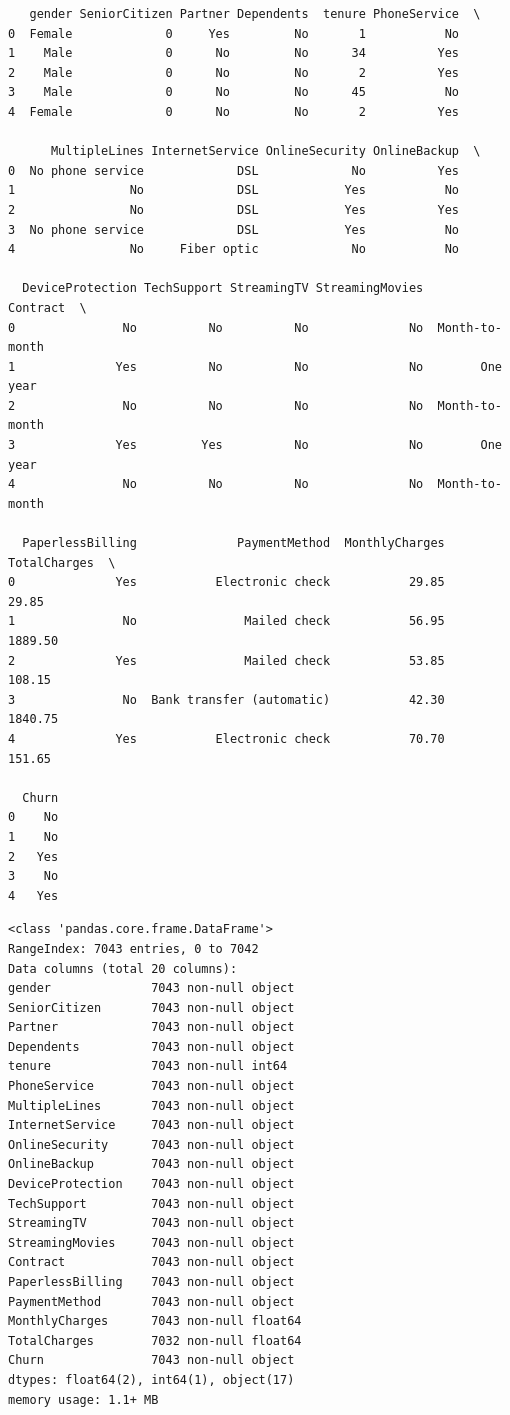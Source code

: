\documentclass[8pt,onecolumn,aps,pra]{revtex4-1}
\begin{document}
    
    \begin{verbatim}
   gender SeniorCitizen Partner Dependents  tenure PhoneService  \
0  Female             0     Yes         No       1           No   
1    Male             0      No         No      34          Yes   
2    Male             0      No         No       2          Yes   
3    Male             0      No         No      45           No   
4  Female             0      No         No       2          Yes   

      MultipleLines InternetService OnlineSecurity OnlineBackup  \
0  No phone service             DSL             No          Yes   
1                No             DSL            Yes           No   
2                No             DSL            Yes          Yes   
3  No phone service             DSL            Yes           No   
4                No     Fiber optic             No           No   

  DeviceProtection TechSupport StreamingTV StreamingMovies        Contract  \
0               No          No          No              No  Month-to-month   
1              Yes          No          No              No        One year   
2               No          No          No              No  Month-to-month   
3              Yes         Yes          No              No        One year   
4               No          No          No              No  Month-to-month   

  PaperlessBilling              PaymentMethod  MonthlyCharges  TotalCharges  \
0              Yes           Electronic check           29.85         29.85   
1               No               Mailed check           56.95       1889.50   
2              Yes               Mailed check           53.85        108.15   
3               No  Bank transfer (automatic)           42.30       1840.75   
4              Yes           Electronic check           70.70        151.65   

  Churn  
0    No  
1    No  
2   Yes  
3    No  
4   Yes  
    \end{verbatim}

    
    \begin{Verbatim}[commandchars=\\\{\}]
<class 'pandas.core.frame.DataFrame'>
RangeIndex: 7043 entries, 0 to 7042
Data columns (total 20 columns):
gender              7043 non-null object
SeniorCitizen       7043 non-null object
Partner             7043 non-null object
Dependents          7043 non-null object
tenure              7043 non-null int64
PhoneService        7043 non-null object
MultipleLines       7043 non-null object
InternetService     7043 non-null object
OnlineSecurity      7043 non-null object
OnlineBackup        7043 non-null object
DeviceProtection    7043 non-null object
TechSupport         7043 non-null object
StreamingTV         7043 non-null object
StreamingMovies     7043 non-null object
Contract            7043 non-null object
PaperlessBilling    7043 non-null object
PaymentMethod       7043 non-null object
MonthlyCharges      7043 non-null float64
TotalCharges        7032 non-null float64
Churn               7043 non-null object
dtypes: float64(2), int64(1), object(17)
memory usage: 1.1+ MB

    \end{Verbatim}
\end{document}
